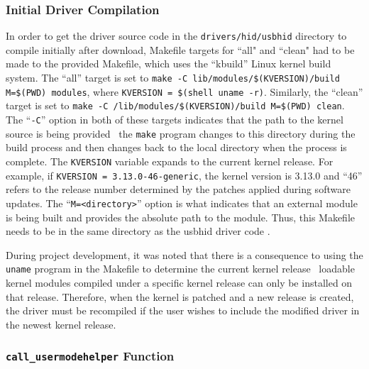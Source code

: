 \documentclass[pagenumbers]{ieee}
\begin{document}
\subsubsection{Initial Driver Compilation}

In order to get the driver source code in the \texttt{drivers/hid/usbhid} directory to compile initially after download, Makefile targets for ``all" and ``clean" had to be made to the provided Makefile, which uses the ``kbuild'' Linux kernel build system. The ``all'' target is set to \texttt{make -C lib/modules/\$(KVERSION)/build M=\$(PWD) modules}, where \texttt{KVERSION = \$(shell uname -r)}. Similarly, the ``clean'' target is set to \texttt{make -C /lib/modules/\$(KVERSION)/build M=\$(PWD) clean}. The ``\texttt{-C}'' option in both of these targets indicates that the path to the kernel source is being provided \textemdash \ the \texttt{make} program changes to this directory during the build process and then changes back to the local directory when the process is complete. The \texttt{KVERSION} variable expands to the current kernel release. For example, if \texttt{KVERSION = 3.13.0-46-generic}, the kernel version is 3.13.0 and ``46'' refers to the release number determined by the patches applied during software updates. The ``\texttt{M=<directory>}'' option is what indicates that an external module is being built and provides the absolute path to the module. Thus, this Makefile needs to be in the same directory as the usbhid driver code \cite{kbuild}.

During project development, it was noted that there is a consequence to using the \texttt{uname} program in the Makefile to determine the current kernel release \textemdash \ loadable kernel modules compiled under a specific kernel release can only be installed on that release. Therefore, when the kernel is patched and a new release is created, the driver must be recompiled if the user wishes to include the modified driver in the newest kernel release.

\subsubsection{\texttt{call\_usermodehelper} Function}
\end{document}
